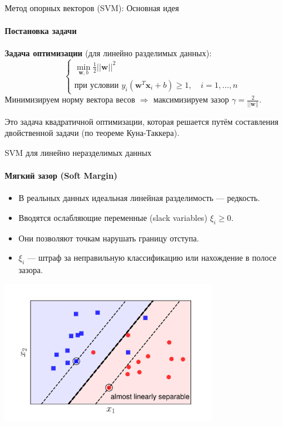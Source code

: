 \documentclass[notheorems, handout]{beamer}
\begin{document}
\begin{frame}{Метод опорных векторов (SVM): Основная идея}
	\framesubtitle{Постановка задачи}

	\textbf{Задача оптимизации} (для линейно разделимых данных):
	\[
	\begin{cases}
		\min_{\mathbf{w}, b} \frac{1}{2} ||\mathbf{w}||^2 \\
		\text{при условии } y_i (\mathbf{w}^T \mathbf{x}_i + b) \geq 1, \quad i = 1, \dots, n
	\end{cases}
	\]
	Минимизируем норму вектора весов $\Rightarrow$ \alert{максимизируем зазор} $\gamma = \frac{2}{||\mathbf{w}||}$.

	Это задача квадратичной оптимизации, которая решается путём составления двойственной задачи (по теореме Куна-Таккера).
\end{frame}

\begin{frame}{SVM для линейно неразделимых данных}
	\framesubtitle{Мягкий зазор (Soft Margin)}

	\begin{itemize}
		\item В реальных данных идеальная линейная разделимость — редкость.
		\item Вводятся \alert{ослабляющие переменные (slack variables)} $\xi_i \geq 0$.
		\item Они позволяют точкам нарушать границу отступа.
		\item $\xi_i$ — штраф за неправильную классификацию или нахождение в полосе зазора.
	\end{itemize}
	\begin{center}
		\includegraphics[width=0.7\textwidth]{img/soft_margin.png}
	\end{center}
\end{frame}
\end{document}
